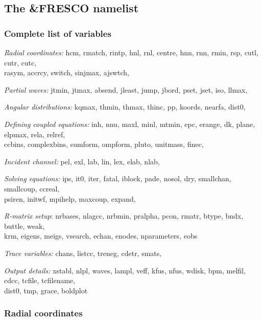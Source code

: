 \documentclass[11pt]{article}
\begin{document}
\subsection{The \&FRESCO namelist}

\subsubsection*{Complete list of variables}

{\em Radial coordinates:}
hcm, rmatch, rintp, hnl, rnl, centre, hnn, rnn, rmin, rsp, cutl, cutr, cutc, \\
rasym, accrcy, switch, sinjmax, ajswtch, 

\noindent
{\em Partial waves:}
jtmin, jtmax, absend, jleast,  jump, jbord, pset, jset,  iso, llmax, 



\noindent
{\em Angular distributions:}
kqmax,  thmin, thmax, thinc, pp, koords,  nearfa, dist0,

\noindent
{\em Defining coupled equations:}
inh, nnu, maxl, minl, mtmin, epc,  erange, dk,  plane,  elpmax, rela, relref,  \\
ccbins, complexbins, sumform, ompform,   pluto,  unitmass, finec,  


\noindent
{\em Incident channel:}
 pel, exl, lab, lin, lex, elab, nlab, 

\noindent
{\em Solving equations:}
ips, it0, iter, fatal, iblock, pade, nosol, dry, smallchan, smallcoup, ccreal,  \\
psiren, initwf, mpihelp,  maxcoup, expand, 


\noindent
{\em R-matrix setup}:
nrbases, nlagcc, nrbmin, pralpha, pcon, rmatr, btype, bndx, buttle, weak, \\
krm, eigens, meigs, vsearch, echan, enodes, nparameters, eobs  

\noindent
{\em Trace variables:}
chans, listcc, treneg, cdetr, smats,    

\noindent
{\em Output details:}
xstabl, nlpl, waves, lampl, veff, kfus, nfus, wdisk, bpm, melfil, cdcc,  tcfile, tcfilename,  \\
dist0, tmp, grace, boldplot


\subsubsection{Radial coordinates}
\end{document}
